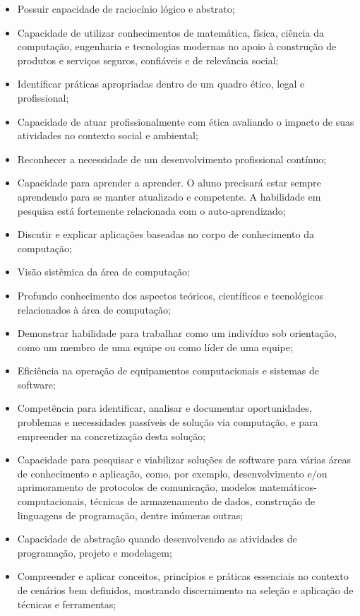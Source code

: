 \begin{itemize}
    \item Possuir capacidade de raciocínio lógico e abstrato;
    \item Capacidade de utilizar conhecimentos de matemática, física, ciência da computação, engenharia e tecnologias modernas no apoio à construção de produtos e serviços seguros, confiáveis e de relevância social;
    \item Identificar práticas apropriadas dentro de um quadro ético, legal e profissional;
    \item Capacidade de atuar profissionalmente com ética avaliando o impacto de suas atividades no contexto social e ambiental;
    \item Reconhecer a necessidade de um desenvolvimento profissional contínuo;
    \item Capacidade para aprender a aprender. O aluno precisará estar sempre aprendendo para se manter atualizado e competente. A habilidade em pesquisa está fortemente relacionada com o auto-aprendizado;
    \item Discutir e explicar aplicações baseadas no corpo de conhecimento da computação;
    \item Visão sistêmica da área de computação;
    \item Profundo conhecimento dos aspectos teóricos, científicos e tecnológicos relacionados à área de computação;
    \item Demonstrar habilidade para trabalhar como um indivíduo sob orientação, como um membro de uma equipe ou como líder de uma equipe;
    \item Eficiência na operação de equipamentos computacionais e sistemas de software;
    \item Competência para identificar, analisar e documentar oportunidades, problemas e necessidades passíveis de solução via computação, e para empreender na concretização desta solução;
    \item Capacidade para pesquisar e viabilizar soluções de software para várias áreas de conhecimento e aplicação, como, por exemplo, desenvolvimento e/ou aprimoramento de protocolos de comunicação, modelos matemáticos-computacionais, técnicas de armazenamento de dados, construção de linguagens de programação, dentre inúmeras outras;
    \item Capacidade de abstração quando desenvolvendo as atividades de programação, projeto e modelagem;
    \item Compreender e aplicar conceitos, princípios e práticas essenciais no contexto de cenários bem definidos, mostrando discernimento na seleção e aplicação de técnicas e ferramentas;

\end{itemize}
